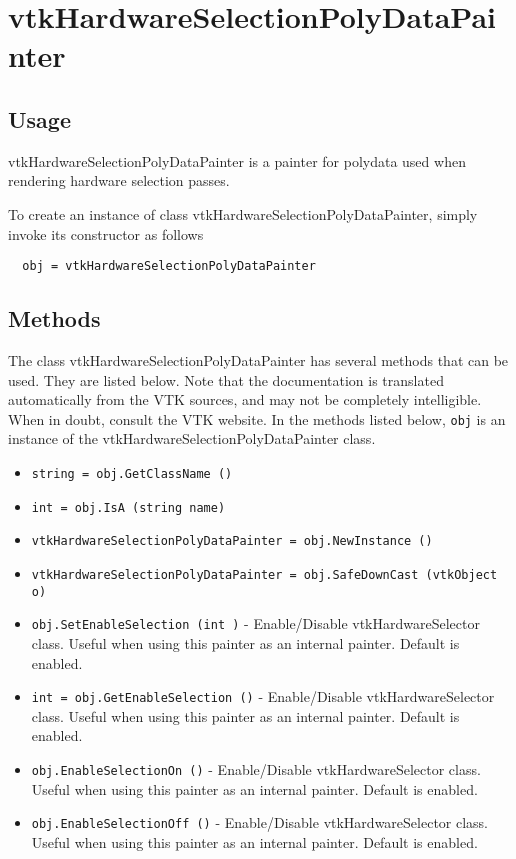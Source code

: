 \section{vtkHardwareSelectionPolyDataPainter}

\subsection{Usage}

 vtkHardwareSelectionPolyDataPainter is a painter for polydata used when
 rendering hardware selection passes.

To create an instance of class vtkHardwareSelectionPolyDataPainter, simply
invoke its constructor as follows
\begin{verbatim}
  obj = vtkHardwareSelectionPolyDataPainter
\end{verbatim}
\subsection{Methods}

The class vtkHardwareSelectionPolyDataPainter has several methods that can be used.
  They are listed below.
Note that the documentation is translated automatically from the VTK sources,
and may not be completely intelligible.  When in doubt, consult the VTK website.
In the methods listed below, \verb|obj| is an instance of the vtkHardwareSelectionPolyDataPainter class.
\begin{itemize}
\item  \verb|string = obj.GetClassName ()|

\item  \verb|int = obj.IsA (string name)|

\item  \verb|vtkHardwareSelectionPolyDataPainter = obj.NewInstance ()|

\item  \verb|vtkHardwareSelectionPolyDataPainter = obj.SafeDownCast (vtkObject o)|

\item  \verb|obj.SetEnableSelection (int )| -  Enable/Disable vtkHardwareSelector class. Useful when using this painter as
 an internal painter. Default is enabled.

\item  \verb|int = obj.GetEnableSelection ()| -  Enable/Disable vtkHardwareSelector class. Useful when using this painter as
 an internal painter. Default is enabled.

\item  \verb|obj.EnableSelectionOn ()| -  Enable/Disable vtkHardwareSelector class. Useful when using this painter as
 an internal painter. Default is enabled.

\item  \verb|obj.EnableSelectionOff ()| -  Enable/Disable vtkHardwareSelector class. Useful when using this painter as
 an internal painter. Default is enabled.

\end{itemize}
